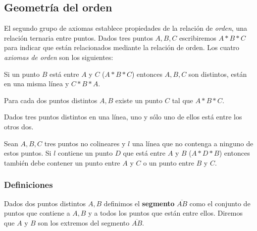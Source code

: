 \subsection{Geometría del orden}

El segundo grupo de axiomas establece propiedades de la relación de
\textit{orden}, una relación ternaria entre puntos. Dados tres puntos $A, B, C$
escribiremos $A * B * C$ para indicar que están relacionados mediante la
relación de orden.
Los cuatro \textit{axiomas de orden} son los siguientes:

\begin{ax}\label{ax:B1}
	Si un punto $B$ está entre $A$ y $C$ ($A * B * C$) entonces $A, B, C$ son
	distintos, están en una misma línea y $C * B * A$.
\end{ax}

\begin{ax}\label{ax:B2}
	Para cada dos puntos distintos $A,B$ existe un punto $C$ tal que $A * B * C$.
\end{ax}

\begin{ax}\label{ax:3}
	Dados tres puntos distintos en una línea, uno y sólo uno de ellos está entre
	los otros dos.
\end{ax}

\begin{ax}[Pasch]\label{ax:4}
	Sean $A, B, C$ tres puntos no colineares y $l$ una línea que no contenga a
	ninguno de estos puntos. Si $l$ contiene un punto $D$ que está entre $A$ y $B$
	($A * D * B$) entonces también debe contener un punto entre $A$ y $C$ o un
	punto entre $B$ y $C$.
\end{ax}



\subsubsection*{Definiciones}

\begin{defin*}[Segmentos]
  Dados dos puntos distintos $A, B$ definimos el \textbf{segmento}
  $\overline{AB}$ como el conjunto de puntos que contiene a $A, B$ y a todos los
  puntos que están entre ellos. Diremos que $A$ y $B$ son los extremos del
  segmento $\overline{AB}$.
\end{defin*}


